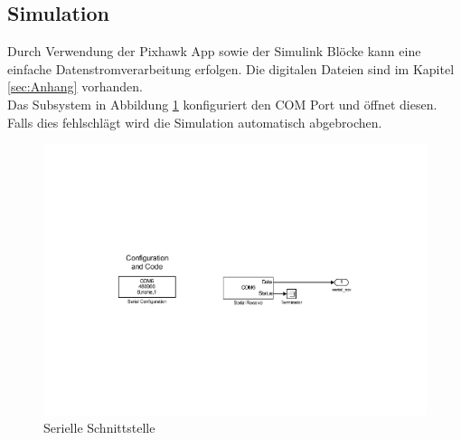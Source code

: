 \subsection{Simulation}
Durch Verwendung der Pixhawk App sowie der Simulink Blöcke kann eine einfache Datenstromverarbeitung erfolgen. Die digitalen Dateien sind im Kapitel \ref{sec:Anhang} vorhanden.\\

\noindent
Das Subsystem in Abbildung \ref{fig:sub_sim_system} konfiguriert den COM Port und öffnet diesen. Falls dies fehlschlägt wird die Simulation automatisch abgebrochen.
\begin{figure}[H]
  \begin{center}
  \includegraphics[scale=0.6, trim={5cm 8.5cm 5.5cm 8.5cm},clip]{pic/70_eigene_app/Serial_output.pdf}
  \caption{Serielle Schnittstelle}
  \label{fig:sub_sim_system}
  \end{center}
\end{figure}

